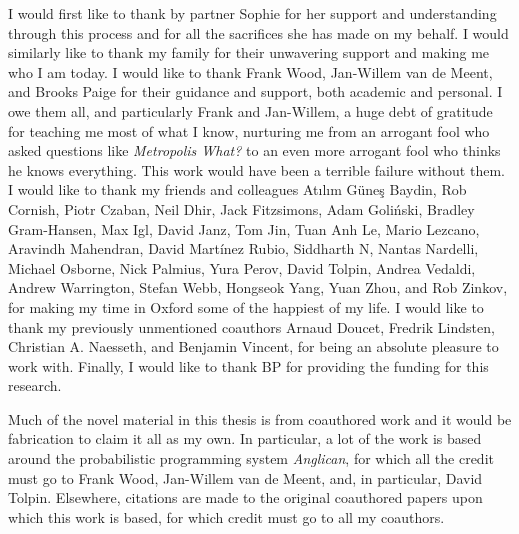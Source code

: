 
\vspace{20pt}
I would first like to thank by partner Sophie for her support and understanding through this
process and for all the sacrifices she has made on my behalf.  I would similarly like to
thank my family for their unwavering support and making me who I am today.  I would like
to thank Frank Wood, Jan-Willem van de Meent, and Brooks Paige for their guidance and
support, both academic and personal.  I owe them all, and particularly Frank and Jan-Willem,
a huge debt of gratitude for teaching me most of what I know, nurturing me from an
arrogant fool who asked questions like \emph{Metropolis What?} to an even more arrogant
fool who thinks he knows everything.  This work would have been a terrible failure without them.
I would like to thank my friends and colleagues 
Atılım Güneş Baydin, Rob Cornish, Piotr Czaban, Neil Dhir, Jack Fitzsimons, Adam Goliński,
Bradley Gram-Hansen, Max Igl, David Janz, Tom Jin, Tuan Anh Le, Mario Lezcano, 
Aravindh Mahendran, David Martínez Rubio, Siddharth N, Nantas Nardelli, Michael Osborne,
Nick Palmius, Yura Perov, David Tolpin, Andrea Vedaldi, Andrew Warrington, Stefan Webb, 
Hongseok Yang, Yuan Zhou, and Rob Zinkov, for making my time in Oxford some of the 
happiest of my life.  I would like to thank my previously unmentioned coauthors Arnaud Doucet, Fredrik Lindsten,
Christian A. Naesseth, and Benjamin Vincent, for being an absolute pleasure to work with.
Finally, I would like to thank BP for providing the funding for this research.

Much of the novel material in this thesis is from coauthored work and it would be fabrication
to claim it all as my own.  In particular, a lot of the work is based around the probabilistic 
programming system \emph{Anglican}, for which all the credit must go to Frank Wood,
Jan-Willem van de Meent, and, in particular, David Tolpin. Elsewhere, citations are made
to the original coauthored papers upon which this work is based, for which credit
must go to all my coauthors.